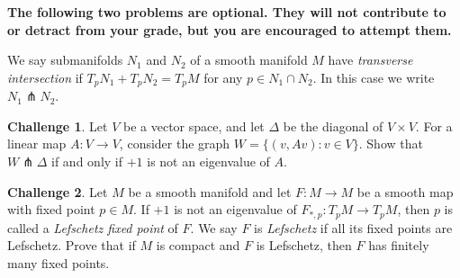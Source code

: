 \documentclass{amsart}
\newcommand{\+}[1]{\ensuremath{\mathbf{#1}}}
\theoremstyle{definition}
\newtheorem{chal}{Challenge}
\begin{document}
\vspace{5mm}

{\bf The following two problems are optional.  They
will not contribute to or detract from your grade, but you are encouraged
to attempt them.}

\vspace{5mm}

We say submanifolds $N_1$ and $N_2$ of a smooth manifold $M$
have \emph{transverse intersection} if $T_pN_1 + T_pN_2 = T_pM$
for any $p \in N_1 \cap N_2$.  In this case we write $N_1 \pitchfork N_2$.

\begin{chal}
Let $V$ be a vector space, and let $\Delta$ be the
diagonal of $V \times V$.  For a linear map $A: V \to V$,
consider the graph $W = \{(v,Av):v \in V\}$.  Show
that $W \pitchfork \Delta$ if and only if $+1$ is not an eigenvalue
of $A$.
\end{chal}

\begin{chal}
Let $M$ be a smooth manifold and let $F: M \to M$ be a smooth map with fixed point $p \in M$.  If $+1$ is not an eigenvalue
of $F_{*,p}: T_pM \to T_pM$, then $p$ is called a \emph{Lefschetz
fixed point} of $F$.  We say $F$ is \emph{Lefschetz} if
all its fixed points are Lefschetz.  Prove that if $M$ is compact
and $F$ is Lefschetz, then $F$ has finitely many fixed points.
\end{chal}
\end{document}
